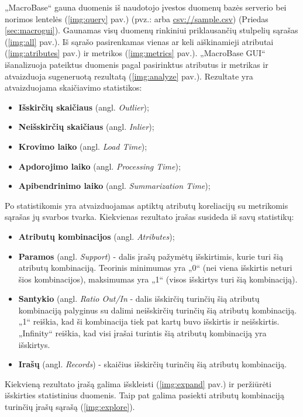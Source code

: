 \documentclass{VUMIFPSkursinis}
\begin{document}
„MacroBase“ gauna duomenis iš naudotojo įvestos duomenų bazės serverio bei norimos lentelės (\ref{img:query} pav.) (pvz.:  arba \url{csv://sample.csv}) (Priedas \ref{sec:macrogui}). Gaunamas visų duomenų rinkiniui priklausančių stulpelių sąrašas (\ref{img:all} pav.). Iš sąrašo pasirenkamas vienas ar keli aiškinamieji atributai (\ref{img:atributes} pav.) ir metrikos (\ref{img:metrics} pav.). „MacroBase GUI“ išanalizuoja pateiktus duomenis pagal pasirinktus atributus ir metrikas ir atvaizduoja sugeneruotą rezultatą (\ref{img:analyze} pav.). Rezultate yra atvaizduojama skaičiavimo statistikos:
\begin{itemize}
\item \textbf{Išskirčių skaičiaus} (angl. \textit{Outlier});
\item \textbf{Neišskirčių skaičiaus} (angl. \textit{Inlier});
\item \textbf{Krovimo laiko} (angl. \textit{Load Time});
\item \textbf{Apdorojimo laiko} (angl. \textit{Processing Time});
\item \textbf{Apibendrinimo laiko} (angl. \textit{Summarization Time});
\end{itemize}

Po statistikomis yra atvaizduojamas aptiktų atributų koreliacijų su metrikomis sąrašas jų svarbos tvarka. Kiekvienas rezultato įrašas susideda iš savų statistikų:
\begin{itemize}
\item \textbf{Atributų kombinacijos} (angl. \textit{Atributes});
\item \textbf{Paramos} (angl. \textit{Support}) - dalis įrašų pažymėtų išskirtimis, kurie turi šią atributų kombinaciją. Teorinis minimumas yra „0“ (nei viena išskirtis neturi šios kombinacijos), maksimumas yra „1“ (visos išskirtys turi šią kombinaciją).
\item \textbf{Santykio} (angl. \textit{Ratio Out/In} - dalis išskirčių turinčių šią atributų kombinaciją palyginus su dalimi neišskirčių turinčių šią atributų kombinaciją. „1“ reiškia, kad ši kombinacija tiek pat kartų buvo išskirtis ir neišskirtis. „Infinity“ reiškia, kad visi įrašai turintis šią atributų kombinaciją yra išskirtys.
\item \textbf{Irašų} (angl. \textit{Records}) - skaičius išskirčių turinčių šią atributų kombinaciją.
\end{itemize}

Kiekvieną rezultato įrašą galima išskleisti (\ref{img:expand} pav.) ir peržiūrėti išskirties statistinius duomenis. Taip pat galima pasiekti atributų kombinaciją turinčių įrašų sąrašą (\ref{img:explore}).\par
\end{document}
